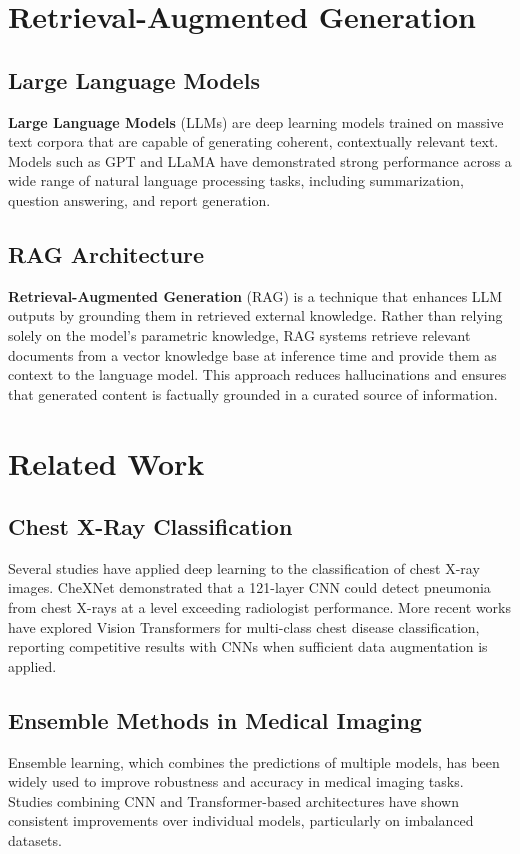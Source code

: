 \documentclass[12pt]{report}
\begin{document}
\section{Retrieval-Augmented Generation}

\subsection{Large Language Models}
\textbf{Large Language Models} (LLMs) are deep learning models trained on massive
text corpora that are capable of generating coherent, contextually
relevant text. Models such as GPT and LLaMA have demonstrated strong
performance across a wide range of natural language processing tasks,
including summarization, question answering, and report generation.

\subsection{RAG Architecture}
\textbf{Retrieval-Augmented Generation} (RAG) is a technique that enhances LLM
outputs by grounding them in retrieved external knowledge. Rather than
relying solely on the model's parametric knowledge, RAG systems retrieve
relevant documents from a vector knowledge base at inference time and
provide them as context to the language model. This approach reduces
hallucinations and ensures that generated content is factually grounded
in a curated source of information.

\section{Related Work}

\subsection{Chest X-Ray Classification}
Several studies have applied deep learning to the classification of
chest X-ray images. CheXNet \cite{rajpurkar2017chexnet} demonstrated
that a 121-layer CNN could detect pneumonia from chest X-rays at a
level exceeding radiologist performance. More recent works have explored
Vision Transformers for multi-class chest disease classification,
reporting competitive results with CNNs when sufficient data augmentation
is applied.

\subsection{Ensemble Methods in Medical Imaging}
Ensemble learning, which combines the predictions of multiple models,
has been widely used to improve robustness and accuracy in medical
imaging tasks. Studies combining CNN and Transformer-based architectures
have shown consistent improvements over individual models, particularly
on imbalanced datasets.
\end{document}
